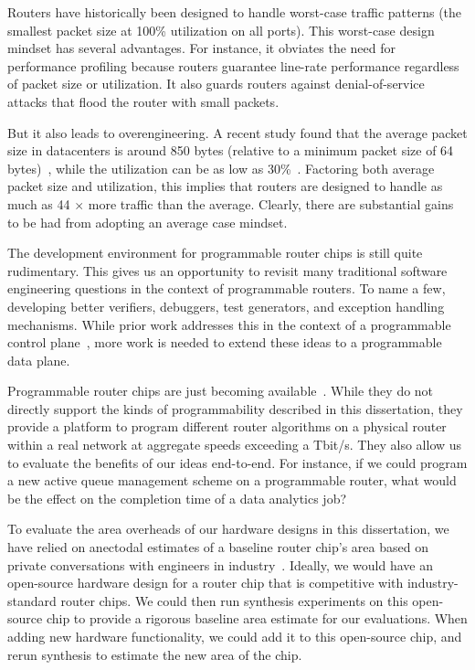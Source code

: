  Routers have historically been
designed to handle worst-case traffic patterns (\ie the smallest packet size at
100\% utilization on all ports). This worst-case design mindset has several
advantages. For instance, it obviates the need for performance profiling
because routers guarantee line-rate performance regardless of packet size or
utilization. It also guards routers against denial-of-service attacks that flood
the router with small packets.

But it also leads to overengineering. A recent study found that the average
packet size in datacenters is around 850 bytes (relative to a minimum packet
size of 64 bytes)~\cite{theo_dc}, while the utilization can be as low as
30\%~\cite{theo_dc}. Factoring both average packet size and utilization, this
implies that routers are designed to handle as much as 44 $\times$ more traffic
than the average. Clearly, there are substantial gains to be had from adopting
an average case mindset.

 The development
environment for programmable router chips is still quite rudimentary. This
gives us an opportunity to revisit many traditional software engineering
questions in the context of programmable routers. To name a few, developing
better verifiers, debuggers, test generators, and exception handling
mechanisms. While prior work addresses this in the context of a programmable
control plane~\cite{test_gen, hsa}, more work is needed to extend these ideas
to a programmable data plane.

 Programmable
router chips are just becoming available~\cite{tofino}. While they do not
directly support the kinds of programmability described in this dissertation,
they provide a platform to program different router algorithms on a physical
router within a real network at aggregate speeds exceeding a Tbit/s.  They also
allow us to evaluate the benefits of our ideas end-to-end. For instance, if we
could program a new active queue management scheme on a programmable router,
what would be the effect on the completion time of a data analytics job?

 To evaluate the area
overheads of our hardware designs in this dissertation, we have relied on
anectodal estimates of a baseline router chip's area based on private
conversations with engineers in industry~\cite{gibb_parsing}. Ideally, we would
have an open-source hardware design for a router chip that is competitive with
industry-standard router chips. We could then run synthesis experiments on this
open-source chip to provide a rigorous baseline area estimate for our
evaluations.  When adding new hardware functionality, we could add it to this
open-source chip, and rerun synthesis to estimate the new area of the chip.

